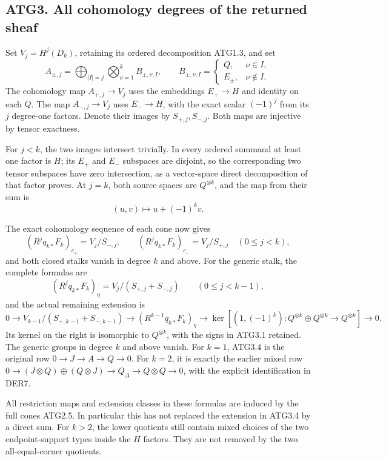 \subsection{ATG3. All cohomology degrees of the returned
sheaf}\label{atg3.-all-cohomology-degrees-of-the-returned-sheaf}

Set \(V_j=H^j(D_k)\), retaining its ordered decomposition ATG1.3, and
set \[
A_{\pm,j}=
\bigoplus_{|I|=j}
\bigotimes_{\nu=1}^k B_{\pm,\nu,I},\qquad
B_{\pm,\nu,I}=\begin{cases}Q,&\nu\in I,\\E_\pm,&\nu\notin I.\end{cases}
\] The cohomology map \(A_{+,j}\to V_j\) uses the embeddings
\(E_+\to H\) and identity on each \(Q\). The map \(A_{-,j}\to V_j\) uses
\(E_-\to H\), with the exact scalar \((-1)^j\) from its \(j\) degree-one
factors. Denote their images by \(S_{+,j},S_{-,j}\). Both maps are
injective by tensor exactness.

For \(j<k\), the two images intersect trivially. In every ordered
summand at least one factor is \(H\); its \(E_+\) and \(E_-\) subspaces
are disjoint, so the corresponding two tensor subspaces have zero
intersection, as a vector-space direct decomposition of that factor
proves. At \(j=k\), both source spaces are \(Q^{\otimes k}\), and the
map from their sum is \[
(u,v)\longmapsto u+(-1)^kv.
\tag{ATG3.1}
\]

The exact cohomology sequence of each cone now gives \[
(R^jq_{k*}F_k)_{c_+}=V_j/S_{-,j},\qquad
(R^jq_{k*}F_k)_{c_-}=V_j/S_{+,j}\quad(0\le j<k),
\tag{ATG3.2}
\] and both closed stalks vanish in degree \(k\) and above. For the
generic stalk, the complete formulas are \[
(R^jq_{k*}F_k)_\eta
=V_j/(S_{+,j}+S_{-,j})\qquad(0\le j<k-1),
\tag{ATG3.3}
\] and the actual remaining extension is \[
\boxed{
0\to V_{k-1}/(S_{+,k-1}+S_{-,k-1})
\to (R^{k-1}q_{k*}F_k)_\eta
\to \ker[(1,(-1)^k):Q^{\otimes k}\oplus Q^{\otimes k}\to Q^{\otimes k}]
\to0.}
\tag{ATG3.4}
\] Its kernel on the right is isomorphic to \(Q^{\otimes k}\), with the
signs in ATG3.1 retained. The generic groups in degree \(k\) and above
vanish. For \(k=1\), ATG3.4 is the original row
\(0\to J\to A\to Q\to0\). For \(k=2\), it is exactly the earlier mixed
row
\(0\to(J\otimes Q)\oplus(Q\otimes J)\to Q_\Delta\to Q\otimes Q\to0\),
with the explicit identification in DER7.

All restriction maps and extension classes in these formulas are induced
by the full cones ATG2.5. In particular this has not replaced the
extension in ATG3.4 by a direct sum. For \(k>2\), the lower quotients
still contain mixed choices of the two endpoint-support types inside the
\(H\) factors. They are not removed by the two all-equal-corner
quotients.

